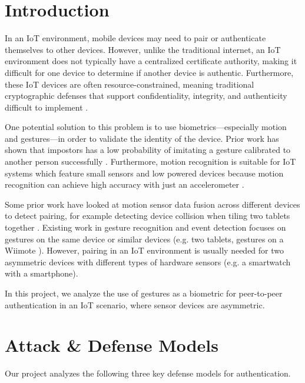 
\section{Introduction}
\label{sec:Introduction}

In an \gls{IoT} environment, mobile devices may need to pair or authenticate themselves to other devices. However, unlike the traditional internet, an \gls{IoT} environment does not typically have a centralized certificate authority, making it difficult for one device to determine if another device is authentic. Furthermore, these \gls{IoT} devices are often resource-constrained, meaning traditional cryptographic defenses that support confidentiality, integrity, and authenticity difficult to implement \cite{cisco:iot-pf,authmodels}.

One potential solution to this problem is to use biometrics---especially motion and gestures---in order to validate the identity of the device. Prior work has shown that impostors has a low probability of imitating a gesture calibrated to another person successfully \cite{Casanova}. Furthermore, motion recognition is suitable for \gls{IoT} systems which feature small sensors and low powered devices because motion recognition can achieve high accuracy with just an accelerometer \cite{RuizeXu}. 

Some prior work have looked at motion sensor data fusion across different devices to detect pairing, for example detecting device collision when tiling two tablets together \cite{SyncGes}. Existing work in gesture recognition and event detection focuses on gestures on the same device or similar devices (e.g. two tablets, gestures on a Wiimote \cite{LiuuWave}). However, pairing in an \gls{IoT} environment is usually needed for two asymmetric devices with different types of hardware sensors (e.g. a smartwatch with a smartphone).

In this project, we analyze the use of gestures as a biometric for peer-to-peer authentication in an \gls{IoT} scenario, where sensor devices are asymmetric. 

\section{Attack \& Defense Models}
\label{sec:Attacks}

Our project analyzes the following three key defense models for authentication.

